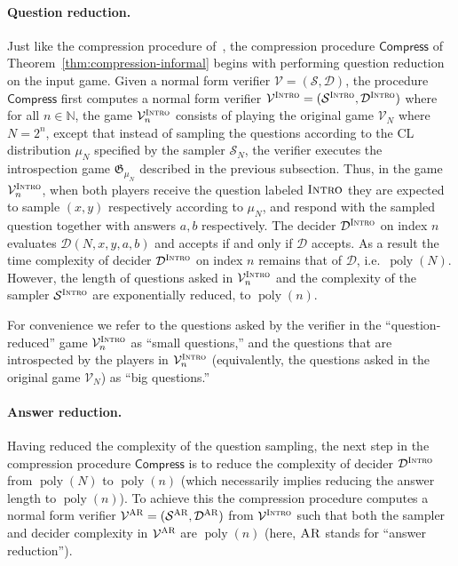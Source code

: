 \documentclass[11pt]{article}
\theoremstyle{definition}
\newcommand{\N}{\ensuremath{\mathbb{N}}}
\DeclareMathOperator{\poly}{poly}
\newcommand{\game}{\mathfrak{G}}
\newcommand{\sampler}{\mathcal{S}}
\newcommand{\decider}{\mathcal{D}}
\newcommand{\verifier}{\mathcal{V}}
\newcommand{\gamestyle}[1]{\ensuremath{\textsc{#1}}\xspace}
\newcommand{\ar}{\gamestyle{AR}}
\newcommand{\intro}{\gamestyle{Intro}}
\newcommand{\typestyle}[1]{\ensuremath{\textsc{#1}}\xspace}
\newcommand{\Intro}{\typestyle{Intro}}
\newcommand{\tmstyle}[1]{\ensuremath{\mathsf{#1}}}
\newcommand{\Compress}{\tmstyle{Compress}}
\begin{document}
\paragraph{Question reduction.} Just like the compression procedure of~\cite{NW19}, the compression procedure $\Compress$ of Theorem~\ref{thm:compression-informal} begins with performing question reduction on the input game. Given a normal form verifier $\verifier = (\sampler,\decider)$, the procedure $\Compress$ first computes a normal form verifier $\verifier^\intro = (\sampler^\intro,\decider^\intro)$ where for all $n \in \N$, the game $\verifier^\intro_n$ consists of playing the original game $\verifier_N$ where $N = 2^n$, except that instead of sampling the questions according to the CL distribution $\mu_N$ specified by the sampler $\sampler_N$, the verifier executes the introspection game $\game_{\mu_N}$  described in the previous subsection. Thus, in the game $\verifier^\intro_n$, when both players receive the question labeled $\Intro$ they are expected to sample $(x,y)$ respectively according to $\mu_N$, and respond with the sampled question together with answers $a,b$ respectively. The decider $\decider^\intro$ on index $n$ evaluates $\decider(N,x,y,a,b)$ and accepts if and only if $\decider$ accepts. As a result the time complexity of decider $\decider^\intro$ on index $n$ remains that of $\decider$, i.e.\ $\poly(N)$. However, the length of questions asked in $\verifier^\intro_n$ and the complexity of the sampler $\sampler^\intro$ are exponentially reduced, to $\poly(n)$.

For convenience we refer to the questions asked by the verifier in the ``question-reduced'' game $\verifier^\intro_n$ as ``small questions,'' and the questions that are introspected by the players in $\verifier^\intro_n$ (equivalently, the questions asked in the original game $\verifier_N$) as ``big questions.'' 

		
\paragraph{Answer reduction.} 
Having reduced the complexity of the question sampling, the next step in the compression procedure $\Compress$ is to reduce the complexity of decider $\decider^\intro$ from $\poly(N)$ to $\poly(n)$ (which necessarily implies reducing the answer length to $\poly(n)$). To achieve this the compression procedure computes a normal form verifier $\verifier^\ar = (\sampler^\ar,\decider^\ar)$ from $\verifier^\intro$ such that both the sampler and decider complexity in $\verifier^\ar$ are $\poly(n)$ (here, $\ar$ stands for ``answer reduction'').
\end{document}
